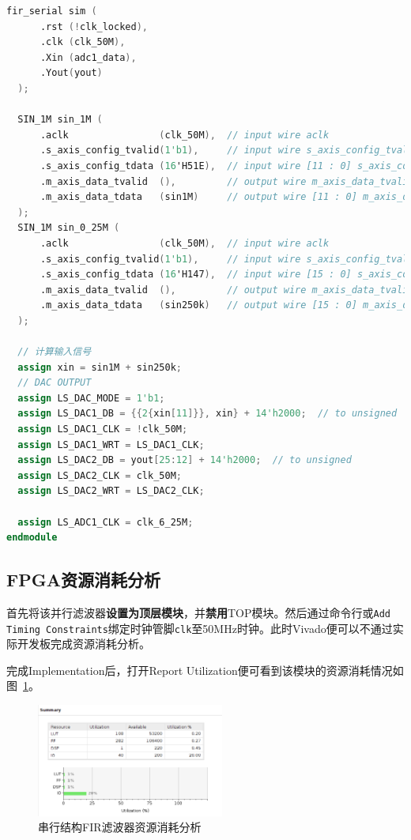 \begin{lstlisting}[language=verilog,caption={TOP模块}]
  fir_serial sim (
      .rst (!clk_locked),
      .clk (clk_50M),
      .Xin (adc1_data),
      .Yout(yout)
  );

  SIN_1M sin_1M (
      .aclk                (clk_50M),  // input wire aclk
      .s_axis_config_tvalid(1'b1),     // input wire s_axis_config_tvalid
      .s_axis_config_tdata (16'H51E),  // input wire [11 : 0] s_axis_config_tdata
      .m_axis_data_tvalid  (),         // output wire m_axis_data_tvalid
      .m_axis_data_tdata   (sin1M)     // output wire [11 : 0] m_axis_data_tdata
  );
  SIN_1M sin_0_25M (
      .aclk                (clk_50M),  // input wire aclk
      .s_axis_config_tvalid(1'b1),     // input wire s_axis_config_tvalid
      .s_axis_config_tdata (16'H147),  // input wire [15 : 0] s_axis_config_tdata
      .m_axis_data_tvalid  (),         // output wire m_axis_data_tvalid
      .m_axis_data_tdata   (sin250k)   // output wire [15 : 0] m_axis_data_tdata
  );

  // 计算输入信号
  assign xin = sin1M + sin250k;
  // DAC OUTPUT
  assign LS_DAC_MODE = 1'b1;
  assign LS_DAC1_DB = {{2{xin[11]}}, xin} + 14'h2000;  // to unsigned
  assign LS_DAC1_CLK = !clk_50M;
  assign LS_DAC1_WRT = LS_DAC1_CLK;
  assign LS_DAC2_DB = yout[25:12] + 14'h2000;  // to unsigned
  assign LS_DAC2_CLK = clk_50M;
  assign LS_DAC2_WRT = LS_DAC2_CLK;

  assign LS_ADC1_CLK = clk_6_25M;
endmodule

\end{lstlisting}
\subsection{FPGA资源消耗分析}
首先将该并行滤波器\textbf{设置为顶层模块}，并\textbf{禁用}TOP模块。然后通过命令行或\texttt{Add Timing Constraints}绑定时钟管脚\texttt{clk}至50MHz时钟。此时Vivado便可以不通过实际开发板完成资源消耗分析。

完成Implementation后，打开Report Utilization便可看到该模块的资源消耗情况如图~\ref{fig:exp6:util}。
\begin{figure}[htbp]
  \centering
  \includegraphics[width=0.55\textwidth]{figure/exp6/util_summary.png}
  \caption{串行结构FIR滤波器资源消耗分析}
  \label{fig:exp6:util}
\end{figure}

